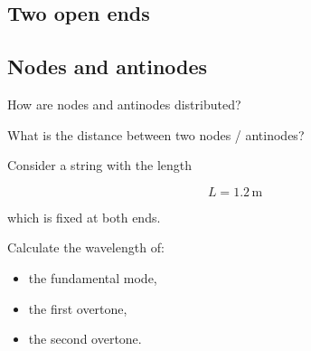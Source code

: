 \documentclass[a4paper,12pt]{article}
\begin{document}
\subsection*{Two open ends}

\begin{center}
\end{center}


\subsection*{Nodes and antinodes}

How are nodes and antinodes distributed?

What is the distance between two nodes / antinodes?


\vspace{1cm}

Consider a string with the length

\[
L = 1.2\,\mathrm{m}
\]

which is fixed at both ends.

Calculate the wavelength of:

\begin{itemize}
    \item the fundamental mode,
    \item the first overtone,
    \item the second overtone.
\end{itemize}
\end{document}
